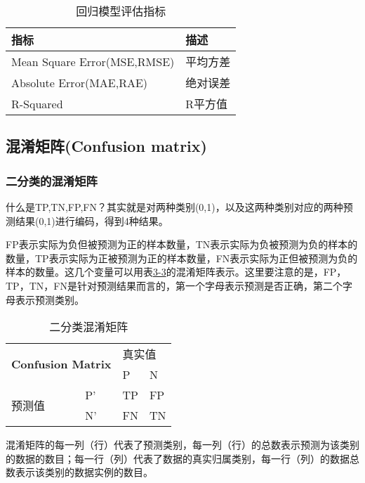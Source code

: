 \begin{table}[]
\caption{回归模型评估指标}
\label{table:3-2}
\centering
\begin{tabular}{|l|l|}
\hline
\textbf{指标}                 & \textbf{描述} \\ \hline
Mean Square Error(MSE,RMSE) & 平均方差        \\ \hline
Absolute Error(MAE,RAE)     & 绝对误差        \\ \hline
R-Squared                   & R平方值        \\ \hline
\end{tabular}
\end{table}

\subsection{混淆矩阵(Confusion matrix)}

\subsubsection{二分类的混淆矩阵}

什么是TP,TN,FP,FN？其实就是对两种类别(0,1)，以及这两种类别对应的两种预测结果(0,1)进行编码，得到4种结果。

FP表示实际为负但被预测为正的样本数量，TN表示实际为负被预测为负的样本的数量，TP表示实际为正被预测为正的样本数量，FN表示实际为正但被预测为负的样本的数量。这几个变量可以用表\href{table:3-3}{3-3}的混淆矩阵表示。这里要注意的是，FP，TP，TN，FN是针对预测结果而言的，第一个字母表示预测是否正确，第二个字母表示预测类别。

\begin{table}[]
\caption{二分类混淆矩阵}
\label{table:3-3}
\centering
\begin{tabular}{|l|l|l|l|}
\hline
\multicolumn{2}{|l|}{\multirow{2}{*}{\textbf{Confusion Matrix}}} & \multicolumn{2}{l|}{真实值} \\ \cline{3-4}
\multicolumn{2}{|l|}{}    & P  & N  \\ \hline
\multirow{2}{*}{预测值} & P' & TP & FP \\ \cline{2-4}
                     & N' & FN & TN \\ \hline
\end{tabular}
\end{table}

混淆矩阵的每一列（行）代表了预测类别，每一列（行）的总数表示预测为该类别的数据的数目；每一行（列）代表了数据的真实归属类别，每一行（列）的数据总数表示该类别的数据实例的数目。

